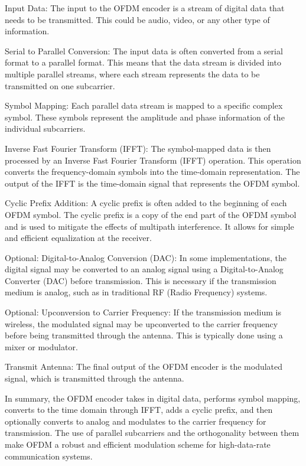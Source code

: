 Input Data:
The input to the OFDM encoder is a stream of digital data that needs to be transmitted. This could be audio, video, or any other type of information.

Serial to Parallel Conversion:
The input data is often converted from a serial format to a parallel format. This means that the data stream is divided into multiple parallel streams, where each stream represents the data to be transmitted on one subcarrier.

Symbol Mapping:
Each parallel data stream is mapped to a specific complex symbol. These symbols represent the amplitude and phase information of the individual subcarriers.

Inverse Fast Fourier Transform (IFFT):
The symbol-mapped data is then processed by an Inverse Fast Fourier Transform (IFFT) operation. This operation converts the frequency-domain symbols into the time-domain representation. The output of the IFFT is the time-domain signal that represents the OFDM symbol.

Cyclic Prefix Addition:
A cyclic prefix is often added to the beginning of each OFDM symbol. The cyclic prefix is a copy of the end part of the OFDM symbol and is used to mitigate the effects of multipath interference. It allows for simple and efficient equalization at the receiver.

Optional: Digital-to-Analog Conversion (DAC):
In some implementations, the digital signal may be converted to an analog signal using a Digital-to-Analog Converter (DAC) before transmission. This is necessary if the transmission medium is analog, such as in traditional RF (Radio Frequency) systems.

Optional: Upconversion to Carrier Frequency:
If the transmission medium is wireless, the modulated signal may be upconverted to the carrier frequency before being transmitted through the antenna. This is typically done using a mixer or modulator.

Transmit Antenna:
The final output of the OFDM encoder is the modulated signal, which is transmitted through the antenna.

In summary, the OFDM encoder takes in digital data, performs symbol mapping, converts to the time domain through IFFT, adds a cyclic prefix, and then optionally converts to analog and modulates to the carrier frequency for transmission. The use of parallel subcarriers and the orthogonality between them make OFDM a robust and efficient modulation scheme for high-data-rate communication systems.






